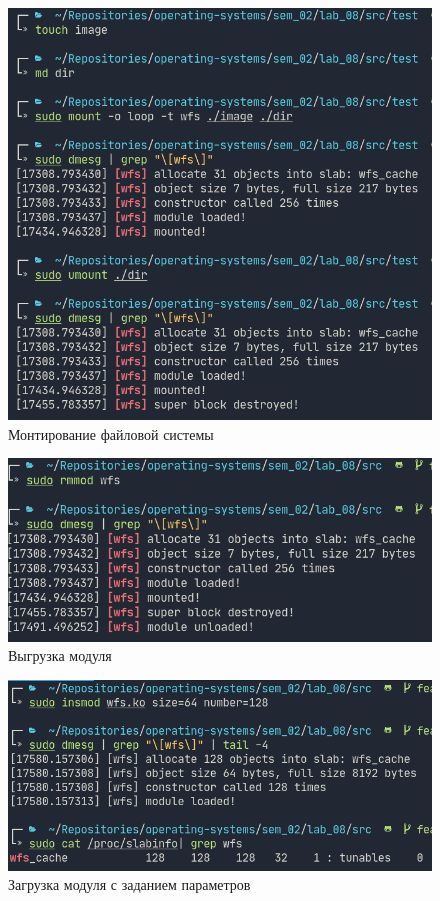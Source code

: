 \begin{figure}[H]
    \centering
    \includegraphics[scale=0.45]{img/mount.png}
    \caption{Монтирование файловой системы}
\end{figure}

\begin{figure}[H]
    \centering
    \includegraphics[scale=0.6]{img/unload.png}
    \caption{Выгрузка модуля}
\end{figure}

\begin{figure}[H]
    \centering
    \includegraphics[scale=0.6]{img/parameters.png}
    \caption{Загрузка модуля с заданием параметров}
\end{figure}
